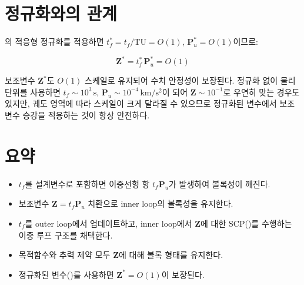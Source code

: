 \documentclass[11pt]{article}
\begin{document}
\section{정규화와의 관계}

\cite{report001}의 적응형 정규화를 적용하면 $t_f^* = t_f / \mathrm{TU} = O(1)$,
$\mathbf{P}_u^* = O(1)$이므로:

\begin{equation}
  \mathbf{Z}^* = t_f^*\, \mathbf{P}_u^* = O(1)
  \label{eq:lifting_scale}
\end{equation}

보조변수 $\mathbf{Z}^*$도 $O(1)$ 스케일로 유지되어 수치 안정성이 보장된다.
정규화 없이 물리 단위를 사용하면
$t_f \sim 10^3\,\mathrm{s}$, $\mathbf{P}_u \sim 10^{-4}\,\mathrm{km/s^2}$이 되어
$\mathbf{Z} \sim 10^{-1}$로 우연히 맞는 경우도 있지만,
궤도 영역에 따라 스케일이 크게 달라질 수 있으므로
정규화된 변수에서 보조변수 승강을 적용하는 것이 항상 안전하다.

\section{요약}

\begin{itemize}
  \item $t_f$를 설계변수로 포함하면 이중선형 항 $t_f \mathbf{P}_u$가 발생하여 볼록성이 깨진다.
  \item 보조변수 $\mathbf{Z} = t_f \mathbf{P}_u$ 치환으로 inner loop의 볼록성을 유지한다.
  \item $t_f$를 outer loop에서 업데이트하고, inner loop에서 $\mathbf{Z}$에 대한
        SCP(\cite{report006})를 수행하는 이중 루프 구조를 채택한다.
  \item 목적함수와 추력 제약 모두 $\mathbf{Z}$에 대해 볼록 형태를 유지한다.
  \item 정규화된 변수(\cite{report001})를 사용하면
        $\mathbf{Z}^* = O(1)$이 보장된다.
\end{itemize}



\end{document}
